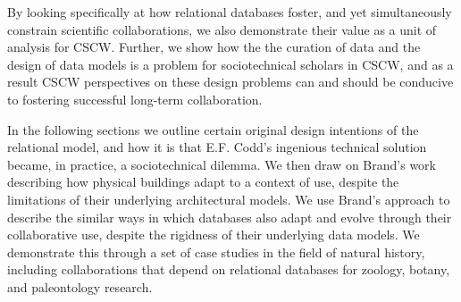By looking specifically at how relational databases foster, and yet simultaneously constrain scientific collaborations, we also demonstrate their value as a unit of analysis for CSCW. Further, we show how the the curation of data and the design of data models is a problem for sociotechnical scholars in CSCW, and as a result CSCW perspectives on these design problems can and should be conducive to fostering successful long-term collaboration. 

In the following sections we outline certain original design intentions of the relational model, and how it is that E.F. Codd's ingenious technical solution became, in practice, a sociotechnical dilemma. We then draw on Brand's work describing how physical buildings adapt to a context of use, despite the limitations of their underlying architectural models. We use Brand's approach to describe the similar ways in which databases also adapt and evolve through their collaborative use, despite the rigidness of their underlying data models. We demonstrate this through a set of case studies in the field of natural history, including collaborations that depend on relational databases for zoology, botany, and paleontology research.  


